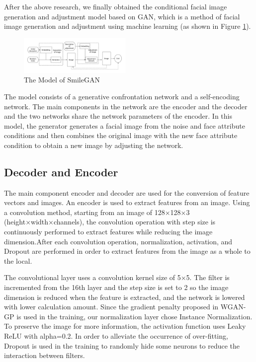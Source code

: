 After the above research, we finally obtained the conditional facial image generation and adjustment model based on GAN,
    which is a method of facial image generation and adjustment using machine learning (as shown in Figure \ref{smliegan}).

\begin{figure}
    \begin{center}
    \includegraphics[width=0.48\textwidth]{figures/model.pdf}
    \caption{The Model of SmileGAN}
    \label{smliegan}
    \end{center}
\end{figure}

The model consists of a generative confrontation network and a self-encoding network.
The main components in the network are the encoder and the decoder and the two networks share the network parameters of the encoder.
In this model, the generator generates a facial image from the noise and face attribute conditions and then combines the original image with the new face attribute condition to obtain a new image by adjusting the network.


\subsection{Decoder and Encoder}

The main component encoder and decoder are used for the conversion of feature vectors and images.
An encoder is used to extract features from an image.
Using a convolution method, starting from an image of 128×128×3 (height×width×channels),
    the convolution operation with step size is continuously performed to extract features while reducing the image dimension.After each convolution operation,
    normalization, activation, and Dropout are performed in order to extract features from the image as a whole to the local.

The convolutional layer uses a convolution kernel size of 5×5.
The filter is incremented from the 16th layer and the step size is set to 2 so the image dimension is reduced when the feature is extracted,
    and the network is lowered with lower calculation amount.
Since the gradient penalty proposed in WGAN-GP is used in the training,
    our normalization layer chose Instance Normalization.
To preserve the image for more information, the activation function uses Leaky ReLU with alpha=0.2.
In order to alleviate the occurrence of over-fitting,
    Dropout is used in the training to randomly hide some neurons to reduce the interaction between filters.

